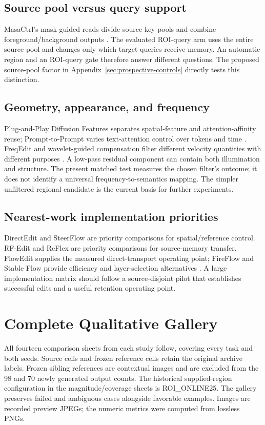 \documentclass[conference]{IEEEtran}
\begin{document}
\subsection{Source pool versus query support}
MasaCtrl's mask-guided reads divide source-key pools and combine foreground/background outputs \cite{cao2023masactrl}. The evaluated ROI-query arm uses the entire source pool and changes only which target queries receive memory. An automatic region and an ROI-query gate therefore answer different questions. The proposed source-pool factor in Appendix~\ref{sec:prospective-controls} directly tests this distinction.

\subsection{Geometry, appearance, and frequency}
Plug-and-Play Diffusion Features separates spatial-feature and attention-affinity reuse; Prompt-to-Prompt varies text-attention control over tokens and time \cite{tumanyan2023pnpfeatures,hertz2023prompttoprompt}. FreqEdit and wavelet-guided compensation filter different velocity quantities with different purposes \cite{liao2025freqedit,tang2026wavelet}. A low-pass residual component can contain both illumination and structure. The present matched test measures the chosen filter's outcome; it does not identify a universal frequency-to-semantics mapping. The simpler unfiltered regional candidate is the current basis for further experiments.

\subsection{Nearest-work implementation priorities}
DirectEdit and SteerFlow are priority comparisons for spatial/reference control. RF-Edit and ReFlex are priority comparisons for source-memory transfer. FlowEdit supplies the measured direct-transport operating point; FireFlow and Stable Flow provide efficiency and layer-selection alternatives \cite{yang2026directedit,dao2026steerflow,wang2025rfsolver,kim2025reflex,kulikov2025flowedit,deng2025fireflow,avrahami2025stableflow}. A large implementation matrix should follow a source-disjoint pilot that establishes successful edits and a useful retention operating point.




\clearpage
\section{Complete Qualitative Gallery}
All fourteen comparison sheets from each study follow, covering every task and both seeds. Source cells and frozen reference cells retain the original archive labels. Frozen sibling references are contextual images and are excluded from the 98 and 70 newly generated output counts. The historical supplied-region configuration in the magnitude/coverage sheets is ROI\_ONLINE25. The gallery preserves failed and ambiguous cases alongside favorable examples. Images are recorded preview JPEGs; the numeric metrics were computed from lossless PNGs.

\end{document}
